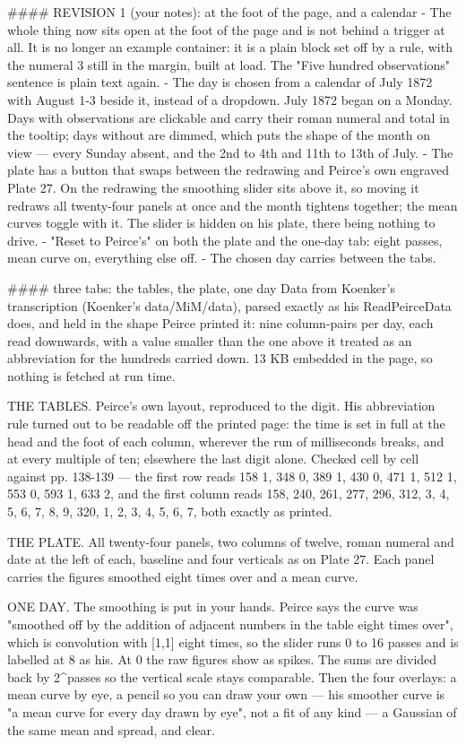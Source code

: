 #### REVISION 1 (your notes): at the foot of the page, and a calendar
- The whole thing now sits open at the foot of the page and is not behind a
  trigger at all. It is no longer an example container: it is a plain block set
  off by a rule, with the numeral 3 still in the margin, built at load. The
  "Five hundred observations" sentence is plain text again.
- The day is chosen from a calendar of July 1872 with August 1-3 beside it,
  instead of a dropdown. July 1872 began on a Monday. Days with observations are
  clickable and carry their roman numeral and total in the tooltip; days without
  are dimmed, which puts the shape of the month on view — every Sunday absent,
  and the 2nd to 4th and 11th to 13th of July.
- The plate has a button that swaps between the redrawing and Peirce's own
  engraved Plate 27. On the redrawing the smoothing slider sits above it, so
  moving it redraws all twenty-four panels at once and the month tightens
  together; the mean curves toggle with it. The slider is hidden on his plate,
  there being nothing to drive.
- "Reset to Peirce's" on both the plate and the one-day tab: eight passes, mean
  curve on, everything else off.
- The chosen day carries between the tabs.

#### three tabs: the tables, the plate, one day
Data from Koenker's transcription (Koenker's data/MiM/data), parsed exactly as
his ReadPeirceData does, and held in the shape Peirce printed it: nine
column-pairs per day, each read downwards, with a value smaller than the one
above it treated as an abbreviation for the hundreds carried down. 13 KB
embedded in the page, so nothing is fetched at run time.

THE TABLES. Peirce's own layout, reproduced to the digit. His abbreviation rule
turned out to be readable off the printed page: the time is set in full at the
head and the foot of each column, wherever the run of milliseconds breaks, and
at every multiple of ten; elsewhere the last digit alone. Checked cell by cell
against pp. 138-139 — the first row reads 158 1, 348 0, 389 1, 430 0, 471 1,
512 1, 553 0, 593 1, 633 2, and the first column reads 158, 240, 261, 277, 296,
312, 3, 4, 5, 6, 7, 8, 9, 320, 1, 2, 3, 4, 5, 6, 7, both exactly as printed.

THE PLATE. All twenty-four panels, two columns of twelve, roman numeral and date
at the left of each, baseline and four verticals as on Plate 27. Each panel
carries the figures smoothed eight times over and a mean curve.

ONE DAY. The smoothing is put in your hands. Peirce says the curve was "smoothed
off by the addition of adjacent numbers in the table eight times over", which is
convolution with [1,1] eight times, so the slider runs 0 to 16 passes and is
labelled at 8 as his. At 0 the raw figures show as spikes. The sums are divided
back by 2^passes so the vertical scale stays comparable. Then the four overlays:
a mean curve by eye, a pencil so you can draw your own — his smoother curve is
"a mean curve for every day drawn by eye", not a fit of any kind — a Gaussian of
the same mean and spread, and clear.

